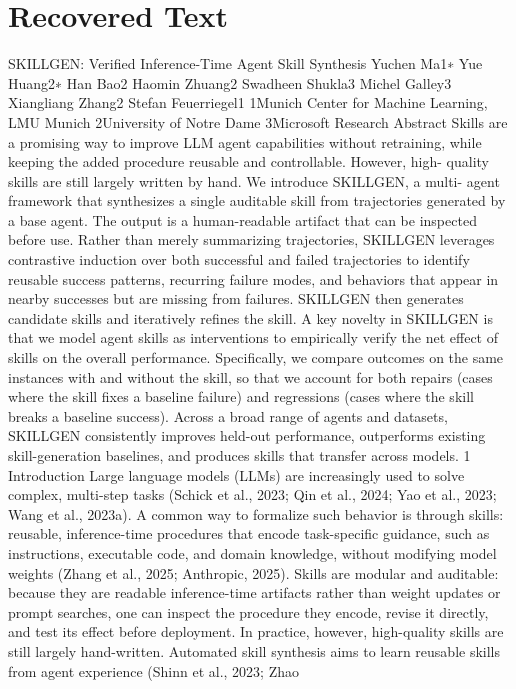 \section{Recovered Text}
SKILLGEN: Verified Inference-Time Agent Skill
Synthesis
Yuchen Ma1∗
Yue Huang2∗
Han Bao2
Haomin Zhuang2
Swadheen Shukla3
Michel Galley3
Xiangliang Zhang2
Stefan Feuerriegel1
1Munich Center for Machine Learning, LMU Munich
2University of Notre Dame
3Microsoft Research
Abstract
Skills are a promising way to improve LLM agent capabilities without retraining,
while keeping the added procedure reusable and controllable. However, high-
quality skills are still largely written by hand. We introduce SKILLGEN, a multi-
agent framework that synthesizes a single auditable skill from trajectories generated
by a base agent. The output is a human-readable artifact that can be inspected before
use. Rather than merely summarizing trajectories, SKILLGEN leverages contrastive
induction over both successful and failed trajectories to identify reusable success
patterns, recurring failure modes, and behaviors that appear in nearby successes but
are missing from failures. SKILLGEN then generates candidate skills and iteratively
refines the skill. A key novelty in SKILLGEN is that we model agent skills as
interventions to empirically verify the net effect of skills on the overall performance.
Specifically, we compare outcomes on the same instances with and without the
skill, so that we account for both repairs (cases where the skill fixes a baseline
failure) and regressions (cases where the skill breaks a baseline success). Across
a broad range of agents and datasets, SKILLGEN consistently improves held-out
performance, outperforms existing skill-generation baselines, and produces skills
that transfer across models.
1
Introduction
Large language models (LLMs) are increasingly used to solve complex, multi-step tasks (Schick
et al., 2023; Qin et al., 2024; Yao et al., 2023; Wang et al., 2023a). A common way to formalize such
behavior is through skills: reusable, inference-time procedures that encode task-specific guidance,
such as instructions, executable code, and domain knowledge, without modifying model weights
(Zhang et al., 2025; Anthropic, 2025). Skills are modular and auditable: because they are readable
inference-time artifacts rather than weight updates or prompt searches, one can inspect the procedure
they encode, revise it directly, and test its effect before deployment. In practice, however, high-quality
skills are still largely hand-written.
Automated skill synthesis aims to learn reusable skills from agent experience (Shinn et al., 2023; Zhao
